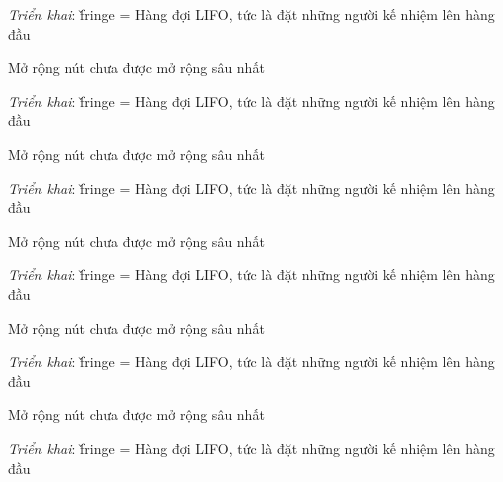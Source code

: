 \documentclass{article}
\begin{document}
\begin{huge}
\emph{Triển khai}:\nl
\v{fringe} = Hàng đợi LIFO, tức là đặt những người kế nhiệm lên hàng đầu

\textwidth
{}



Mở rộng nút chưa được mở rộng sâu nhất

\emph{Triển khai}:\nl
\v{fringe} = Hàng đợi LIFO, tức là đặt những người kế nhiệm lên hàng đầu

\textwidth
{}



Mở rộng nút chưa được mở rộng sâu nhất

\emph{Triển khai}:\nl
\v{fringe} = Hàng đợi LIFO, tức là đặt những người kế nhiệm lên hàng đầu

\textwidth
{}



Mở rộng nút chưa được mở rộng sâu nhất

\emph{Triển khai}:\nl
\v{fringe} = Hàng đợi LIFO, tức là đặt những người kế nhiệm lên hàng đầu

\textwidth
{}



Mở rộng nút chưa được mở rộng sâu nhất

\emph{Triển khai}:\nl
\v{fringe} = Hàng đợi LIFO, tức là đặt những người kế nhiệm lên hàng đầu

\textwidth
{}



Mở rộng nút chưa được mở rộng sâu nhất

\emph{Triển khai}:\nl
\v{fringe} = Hàng đợi LIFO, tức là đặt những người kế nhiệm lên hàng đầu

\textwidth
{}




\end{huge}
\end{document}
